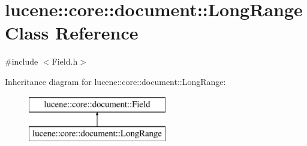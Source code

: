 \hypertarget{classlucene_1_1core_1_1document_1_1LongRange}{}\section{lucene\+:\+:core\+:\+:document\+:\+:Long\+Range Class Reference}
\label{classlucene_1_1core_1_1document_1_1LongRange}


{\ttfamily \#include $<$Field.\+h$>$}

Inheritance diagram for lucene\+:\+:core\+:\+:document\+:\+:Long\+Range\+:\begin{figure}[H]
\begin{center}
\leavevmode
\includegraphics[height=2.000000cm]{classlucene_1_1core_1_1document_1_1LongRange}
\end{center}
\end{figure}
